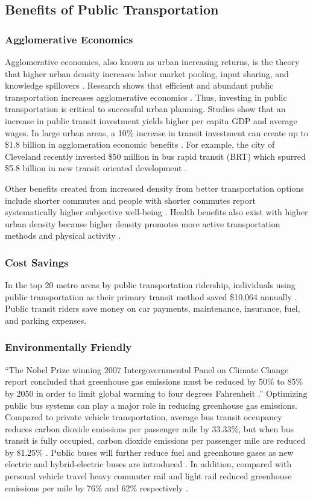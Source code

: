 \documentclass[sigconf]{acmart}
\begin{document}
\subsection{Benefits of Public Transportation}
\subsubsection{Agglomerative Economics} Agglomerative economics, also known as urban increasing returns, is the theory that higher urban density increases labor market pooling, input sharing, and knowledge spillovers \cite{Rosenthal01}. Research shows that efficient and abundant public transportation increases agglomerative economics \cite{Jenkins01}. Thus, investing in public transportation is critical to successful urban planning. Studies show that an increase in public transit investment yields higher per capita GDP and average wages. In large urban areas, a 10\% increase in transit investment can create up to \$1.8 billion in agglomeration economic benefits \cite{Chatman01}. For example, the city of Cleveland recently invested \$50 million in bus rapid transit (BRT) which spurred \$5.8 billion in new transit oriented development \cite{ITDP01}.

Other benefits created from increased density from better transportation options include shorter commutes and people with shorter commutes report systematically higher subjective well-being \cite{Stutzer01}. Health benefits also exist with higher urban density because higher density promotes more active transportation methods and physical activity \cite{Owen01} \cite{Eriksson01} \cite{VanDyck01}.  

\subsubsection{Cost Savings}
In the top 20 metro areas by public transportation ridership, individuals using public transportation as their primary transit method saved \$10,064 annually \cite{Chitwood01}. Public transit riders save money on car payments, maintenance, insurance, fuel, and parking expenses. 

\subsubsection{Environmentally Friendly} ``The Nobel Prize winning 2007 Intergovernmental Panel on Climate Change report concluded that greenhouse gas emissions must be reduced by 50\% to 85\% by 2050 in order to limit global warming to four degrees Fahrenheit \cite{Hodges01}.'' Optimizing public bus systems can play a major role in reducing greenhouse gas emissions. Compared to private vehicle transportation, average bus transit occupancy reduces carbon dioxide emissions per passenger mile by 33.33\%, but when bus transit is fully occupied, carbon dioxide emissions per passenger mile are reduced by 81.25\% \cite{Hodges01}. Public buses will further reduce fuel and greenhouse gases as new electric and hybrid-electric buses are introduced \cite{Marcy01}. In addition, compared with personal vehicle travel heavy commuter rail and light rail reduced greenhouse emissions per mile by 76\% and 62\% respectively \cite{FTA01}.  
\end{document}
